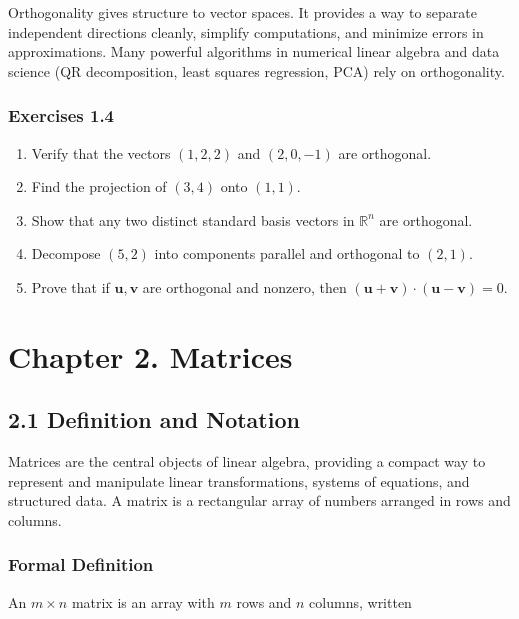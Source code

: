 \documentclass[
  12pt,
  a4paper,
]{article}
\let\oldsection\section
\renewcommand{\section}{\clearpage\oldsection}
\begin{document}
Orthogonality gives structure to vector spaces. It provides a way to
separate independent directions cleanly, simplify computations, and
minimize errors in approximations. Many powerful algorithms in numerical
linear algebra and data science (QR decomposition, least squares
regression, PCA) rely on orthogonality.

\subsubsection{Exercises 1.4}\label{exercises-14}

\begin{enumerate}
\def\labelenumi{\arabic{enumi}.}
\item
  Verify that the vectors \((1,2,2)\) and \((2,0,-1)\) are orthogonal.
\item
  Find the projection of \((3,4)\) onto \((1,1)\).
\item
  Show that any two distinct standard basis vectors in \(\mathbb{R}^n\)
  are orthogonal.
\item
  Decompose \((5,2)\) into components parallel and orthogonal to
  \((2,1)\).
\item
  Prove that if \(\mathbf{u}, \mathbf{v}\) are orthogonal and nonzero,
  then \((\mathbf{u}+\mathbf{v})\cdot(\mathbf{u}-\mathbf{v}) = 0\).
\end{enumerate}

\section{Chapter 2. Matrices}\label{chapter-2-matrices}

\subsection{2.1 Definition and
Notation}\label{21-definition-and-notation}

Matrices are the central objects of linear algebra, providing a compact
way to represent and manipulate linear transformations, systems of
equations, and structured data. A matrix is a rectangular array of
numbers arranged in rows and columns.

\subsubsection{Formal Definition}\label{formal-definition}

An \(m \times n\) matrix is an array with \(m\) rows and \(n\) columns,
written
\end{document}
